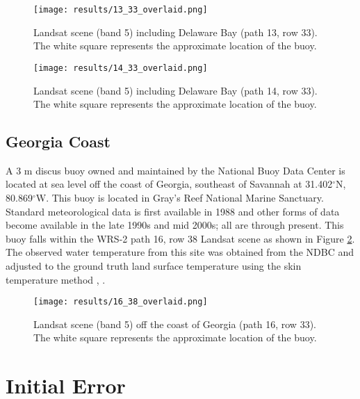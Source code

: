 \documentclass{book}
\begin{document}
\begin{figure}[H]
\begin{minipage}[b]{0.5\linewidth}
\centering
\texttt{[image: results/13\_33\_overlaid.png]}
\caption{Landsat scene (band 5) including Delaware Bay (path 13, row 33).  The white square represents the approximate location of the buoy.}
\label{fig:13_33_overlaid}
\end{minipage}
\hspace{0.5cm}
\begin{minipage}[b]{0.5\linewidth}
\centering
\texttt{[image: results/14\_33\_overlaid.png]}
\caption{Landsat scene (band 5) including Delaware Bay (path 14, row 33).  The white square represents the approximate location of the buoy.}
\label{fig:14_33_overlaid}
\end{minipage}
\end{figure}

\subsection{Georgia Coast}
\label{sec:georgia}

A 3 m discus buoy owned and maintained by the National Buoy Data Center is located at sea level off the coast of Georgia, southeast of Savannah at 31.402$^\circ$N, 80.869$^\circ$W.  This buoy is located in Gray's Reef National Marine Sanctuary.  Standard meteorological data is first available in 1988 and other forms of data become available in the late 1990s and mid 2000s; all are through present.  This buoy falls within the WRS-2 path 16, row 38 Landsat scene as shown in Figure \ref{fig:16_38_overlaid}.  The observed water temperature from this site was obtained from the NDBC and adjusted to the ground truth land surface temperature using the skin temperature method \cite{schott_2012}, \cite{schott_2010}.

\begin{figure}[H]
\centering
\texttt{[image: results/16\_38\_overlaid.png]}
\caption{Landsat scene (band 5) off the coast of Georgia (path 16, row 33).  The white square represents the approximate location of the buoy.}
\label{fig:16_38_overlaid}
\end{figure}

\section{Initial Error}
\label{sec:initialerror}
\end{document}

